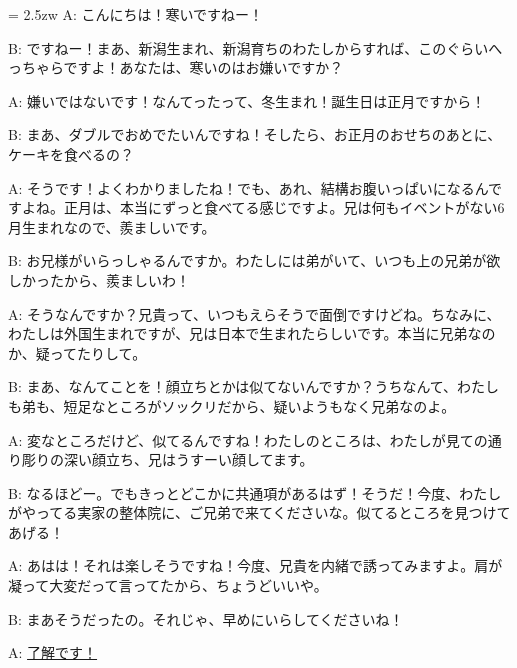 \documentclass[11pt]{amsart}
\title{}
\author{}
\newenvironment{hangall}[1]{\hangindent = 2.5zw\everypar{\hangindent = 2.5zw}}{}
\begin{document}
\maketitle
\begin{hangall}{}%
A: こんにちは！寒いですねー！

B: ですねー！まあ、新潟生まれ、新潟育ちのわたしからすれば、このぐらいへっちゃらですよ！あなたは、寒いのはお嫌いですか？

A: 嫌いではないです！なんてったって、冬生まれ！誕生日は正月ですから！

B: まあ、ダブルでおめでたいんですね！そしたら、お正月のおせちのあとに、ケーキを食べるの？

A: そうです！よくわかりましたね！でも、あれ、結構お腹いっぱいになるんですよね。正月は、本当にずっと食べてる感じですよ。兄は何もイベントがない6月生まれなので、羨ましいです。

B: お兄様がいらっしゃるんですか。わたしには弟がいて、いつも上の兄弟が欲しかったから、羨ましいわ！

A: そうなんですか？兄貴って、いつもえらそうで面倒ですけどね。ちなみに、わたしは外国生まれですが、兄は日本で生まれたらしいです。本当に兄弟なのか、疑ってたりして。

B: まあ、なんてことを！顔立ちとかは似てないんですか？うちなんて、わたしも弟も、短足なところがソックリだから、疑いようもなく兄弟なのよ。

A: 変なところだけど、似てるんですね！わたしのところは、わたしが見ての通り彫りの深い顔立ち、兄はうすーい顔してます。

B: なるほどー。でもきっとどこかに共通項があるはず！そうだ！今度、わたしがやってる実家の整体院に、ご兄弟で来てくださいな。似てるところを見つけてあげる！

A: あはは！それは楽しそうですね！今度、兄貴を内緒で誘ってみますよ。肩が凝って大変だって言ってたから、ちょうどいいや。

B: まあそうだったの。それじゃ、早めにいらしてくださいね！

A: \ul{了解です！}\end{hangall}
\end{document}
